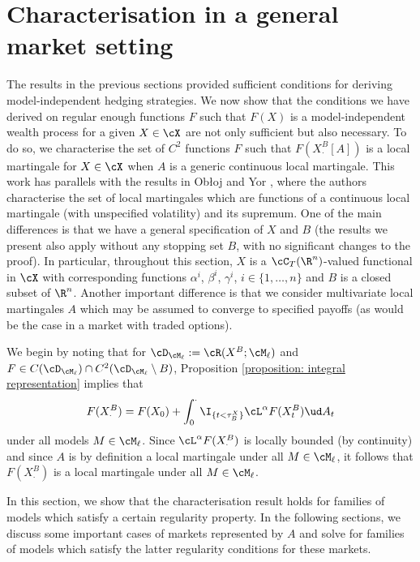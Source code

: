 \documentclass[11pt]{article}
\begin{document}
\section{Characterisation in a general market setting}
\label{section: characterisation theory}

The results in the previous sections provided sufficient conditions for deriving model-independent hedging strategies. We now show that the conditions we have derived on regular enough functions $F$ such that $F(X)$ is a model-independent wealth process for a given $X \in \cX$ are not only sufficient but also necessary. To do so, we characterise the set of $C^2$ functions $F$ such that $F(X^B_\cdot[A])$ is a local martingale for $X \in \cX$ when $A$ is a generic continuous local martingale. This work has parallels with the results in Ob{\l}oj and Yor \cite{Obloj-Yor}, where the authors characterise the set of local martingales which are functions of a continuous local martingale (with unspecified volatility) and its supremum. One of the main differences is that we have a general specification of $X$ and $B$ (the results we present also apply without any stopping set $B$, with no significant changes to the proof). In particular, throughout this section, $X$ is a $\cC_T(\R^n)$-valued functional in $\cX$ with corresponding functions $\alpha^i$, $\beta^i$, $\gamma^i$, $i \in \{1,\ldots,n\}$ and $B$ is a closed subset of $\R^n$. Another important difference is that we consider multivariate local martingales $A$ which may be assumed to converge to specified payoffs (as would be the case in a market with traded options). 

We begin by noting that for $\cD_{\cM_{\ell}} := \cR(X^B;\cM_{\ell})$ and $F \in C(\cD_{\cM_{\ell}}) \cap C^2(\cD_{\cM_{\ell}} \setminus B)$, Proposition \ref{proposition: integral representation} implies that
$$
F(X^B_\cdot) = F(X_0) + \int_0^\cdot \I_{\{ t < \tau^X_B \}} \cL^\alpha F(X^B_t) \ud A_t
$$
under all models $M \in \cM_{\ell}$. Since $\cL^\alpha F(X^B_\cdot)$ is locally bounded (by continuity) and since $A$ is by definition a local martingale under all $M \in \cM_{\ell}$, it follows that $F(X^B_\cdot)$ is a local martingale under all $M \in \cM_{\ell}$.

In this section, we show that the characterisation result holds for families of models which satisfy a certain regularity property. In the following sections, we discuss some important cases of markets represented by $A$ and solve for families of models which satisfy the latter regularity conditions for these markets.
\end{document}
